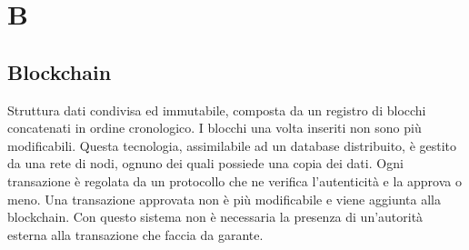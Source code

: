 \section*{B}
\subsection*{Blockchain}
Struttura dati condivisa ed immutabile, composta da un registro di blocchi concatenati in ordine cronologico. I blocchi una volta inseriti non sono più modificabili. Questa tecnologia, assimilabile ad un database distribuito, è gestito da una rete di nodi, ognuno dei quali possiede una copia dei dati.  Ogni transazione è regolata da un protocollo che ne verifica l'autenticità e la approva o meno. Una transazione approvata non è più modificabile e viene aggiunta alla blockchain. Con questo sistema non è necessaria la presenza di un'autorità esterna alla transazione che faccia da garante.

